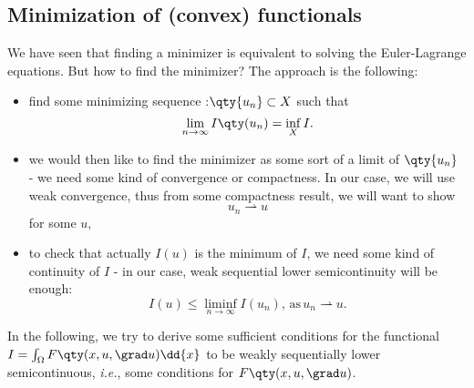 \subsection{Minimization of (convex) functionals}
\label{sec:minimization}
We have seen that finding a minimizer is equivalent to solving the Euler-Lagrange equations. But how to find the minimizer? The approach is the following:
\begin{remark}


	\begin{itemize}
		\item find some minimizing sequence :$ \qty{u_n} \subset X$ such that
			\[
				\lim_{n \to \infty}I\qty(u_n) = \inf_X I.
			\]
		\item we would then like to find the minimizer as some sort of a limit of $\qty{u_n}$ - we need some kind of convergence or compactness. In our case, we will use weak convergence, thus from some compactness result, we will want to show
			\[
				u_n \rightharpoonup u
			\]
			for some $u,$
		\item to check that actually $I(u)$ is the minimum of $I$, we need some kind of continuity of $I$ - in our case, weak sequential lower semicontinuity will be enough:
			\[
				I(u) \leq \liminf_{n \to \infty} I(u_n), \, \text{as} \, u_n \rightharpoonup u.
			\]
	\end{itemize}
\end{remark}

In the following, we try to derive some sufficient conditions for the functional $I = \int_{\Omega}F\qty(x, u, \grad u)\dd{x}$ to be weakly sequentially lower semicontinuous, \textit{i.e.}, some conditions for $F\qty(x, u, \grad u)$. 

